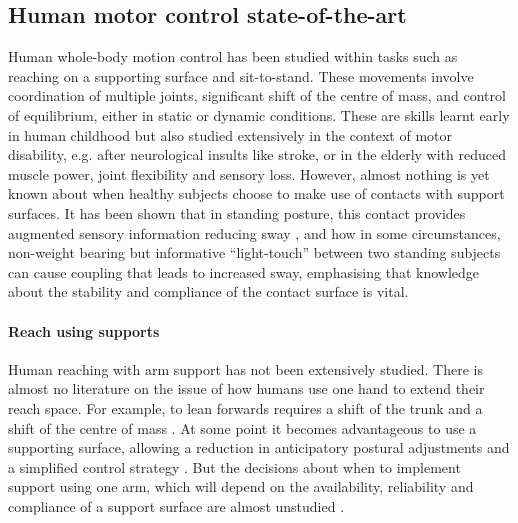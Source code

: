 \documentclass[final,5p,twocolumn]{elsarticle}
\begin{document}
\subsection{Human motor control state-of-the-art}
Human whole-body motion control has been studied within tasks such as reaching on a supporting surface and sit-to-stand. These movements involve coordination of multiple joints, significant shift of the centre of mass, and control of equilibrium, either in static or dynamic conditions. These are skills learnt early in human childhood but also studied extensively in the context of motor disability, e.g. after neurological insults like stroke, or in the elderly with reduced muscle power, joint flexibility and sensory loss. However, almost nothing is yet known about when healthy subjects choose to make use of contacts with support surfaces. It has been shown that in standing posture, this contact provides augmented sensory information reducing sway \cite{Johannsen2012}, and how in some circumstances, non-weight bearing but informative ``light-touch'' between two standing subjects can cause coupling that leads to increased sway, emphasising that knowledge about the stability and compliance of the contact surface is vital.

\paragraph{Reach using supports}
Human reaching with arm support has not been extensively studied. There is almost no literature on the issue of how humans use one hand to extend their reach space. For example, to lean forwards requires a shift of the trunk and a shift of the centre of mass \cite{Huang2011}. At some point it becomes advantageous to use a supporting surface, allowing a reduction in anticipatory postural adjustments and a simplified control strategy \cite{Slijper2000}. But the decisions about when to implement support using one arm, which will depend on the availability, reliability and compliance of a support surface are almost unstudied \cite{Krishnamoorthy2004}.
\end{document}
